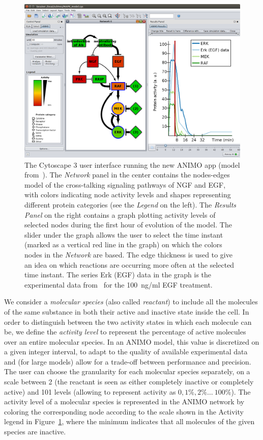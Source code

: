 \documentclass{llncs}
\begin{document}
\begin{figure}[htb]
\begin{center}
   \includegraphics[width=.7\textwidth]{images/ANIMO3_MAPK_model} %
\end{center}\vspace{-.5cm}
\caption{The Cytoscape 3 user interface running the new ANIMO app
(model from~\cite{animo-ieee}). The \emph{Network} panel in the center contains the nodes-edges
model of the cross-talking signaling pathways of NGF and EGF, with
colors indicating node activity levels and shapes representing different protein categories (see the \emph{Legend} on the left).
The \emph{Results Panel} on the right contains a graph plotting activity levels of selected nodes
during the first hour of evolution of the model. The slider under the graph
allows the user to select the time instant (marked as a vertical red line in the graph) on which
the colors nodes in the \emph{Network} are based. The edge thickness is used to give an idea on which reactions are
occurring more often at the selected time instant.
The series {\sf Erk (EGF) data} in the graph is the experimental
data from~\cite{egf-ngf} for the 100~ng/ml EGF treatment.
\label{fig:cytoscape}}
\vspace{-.5cm}
\end{figure}

We consider a \emph{molecular species} (also called \emph{reactant}) to include all the molecules of the same substance in both their active
and inactive state inside the cell. In order to distinguish between the two activity states in which each molecule can be,
we define the \emph{activity level}
to represent the percentage of active molecules over an entire molecular species. In an ANIMO model, this value
is discretized on a given integer interval, to adapt to the quality
of available experimental data and (for large models) allow for a trade-off between performance and precision.
The user can choose the granularity for each molecular species separately, on a scale between 2 (the
reactant is seen as either completely inactive or completely active) and 101 levels (allowing to represent activity as $0, 1\%, 2\% \dots\ 100\%$).
The activity level of a molecular species is represented in the ANIMO network
by coloring the corresponding node according to the scale shown in the {\sf Activity} legend in Figure~\ref{fig:cytoscape},
where the minimum indicates that all molecules of the given species are inactive.
\end{document}
